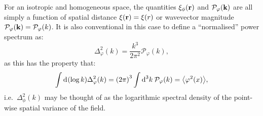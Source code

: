 For an isotropic and homogeneous space, the quantities $\xi_\phi(\vr)$ and $\mathcal{P}_\varphi(\vk)$ are all simply a function of spatial distance ${\xi(\vr) = \xi(r)}$ or wavevector magnitude ${\mathcal{P}_\varphi(\vk) = \mathcal{P}_\varphi(k)}$.
It is also conventional in this case to define a ``normalised'' power spectrum as:
\begin{equation}
  \Delta_\varphi^2(k) = \frac{k^3}{2\pi^2} \mathcal{P}_\varphi(k),
\end{equation}
as this has the property that:
\begin{equation}
  \int \d{(\log k)} \Delta_\varphi^2(k) = {\left( 2\pi \right)}^3\int\d[3]{k}\: \mathcal{P}_\varphi(k) = \mean{\varphi^2(x)},
\end{equation}
i.e.\ $\Delta_\phi^2(k)$ may be thought of as the logarithmic spectral density of the point-wise spatial variance of the field.


